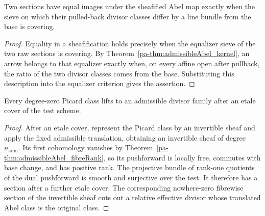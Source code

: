 \begin{theorem}
  \label{pa-thm:admissibleAbel_etaleKernel}
  \leanok

  Two sections have equal images under the sheafified Abel map exactly when the sieve on which
  their pulled-back divisor classes differ by a line bundle from the base is covering.
\end{theorem}
\begin{proof}
  Equality in a sheafification holds precisely when the equalizer sieve of the two raw
  sections is covering.  By Theorem~\ref{pa-thm:admissibleAbel_kernel}, an arrow belongs to that
  equalizer exactly when, on every affine open after pullback, the ratio of the two divisor
  classes comes from the base.  Substituting this description into the equalizer criterion
  gives the assertion.
\end{proof}

\begin{theorem}
  \label{pa-thm:admissibleAbel_etaleLocallySurjective}
  \leanok

  Every degree-zero Picard class lifts to an admissible divisor family after an etale cover of
  the test scheme.
\end{theorem}
\begin{proof}
  After an etale cover, represent the Picard class by an invertible sheaf and apply the fixed
  admissible translation, obtaining an invertible sheaf of degree \(n_{\mathrm{adm}}\).
  Its first cohomology vanishes by Theorem~\ref{pa-thm:admissibleAbel_fibreRank}, so its
  pushforward is locally free, commutes with base change, and has positive rank.  The
  projective bundle of rank-one quotients of the dual pushforward is smooth and surjective
  over the test.  It therefore has a section after a further etale cover.  The corresponding
  nowhere-zero fibrewise section of the invertible sheaf cuts out a relative effective
  divisor whose translated Abel class is the original class.
\end{proof}

